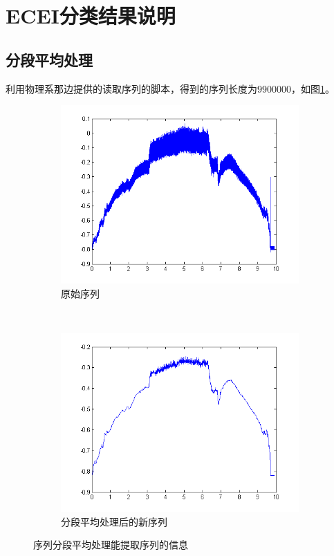 \documentclass[noindent]{ctexart}
\begin{document}
\section*{ECEI分类结果说明}
\subsection*{分段平均处理}
利用物理系那边提供的读取序列的脚本，得到的序列长度为$9900000$，如图\ref{fig:subfig:original}。
\begin{figure}[h]
    \centering
    \begin{subfigure}[b]{0.45\textwidth}
        \includegraphics[width=\textwidth]{495.PNG}
        \caption{原始序列}
        \label{fig:subfig:original}
    \end{subfigure}
    ~ %
    \begin{subfigure}[b]{0.45\textwidth}
        \includegraphics[width=\textwidth]{20000.PNG}
        \caption{分段平均处理后的新序列}
        \label{fig:subfig:new}
    \end{subfigure}
    \caption{序列分段平均处理能提取序列的信息}\label{fig:add}
\end{figure}
\end{document}
